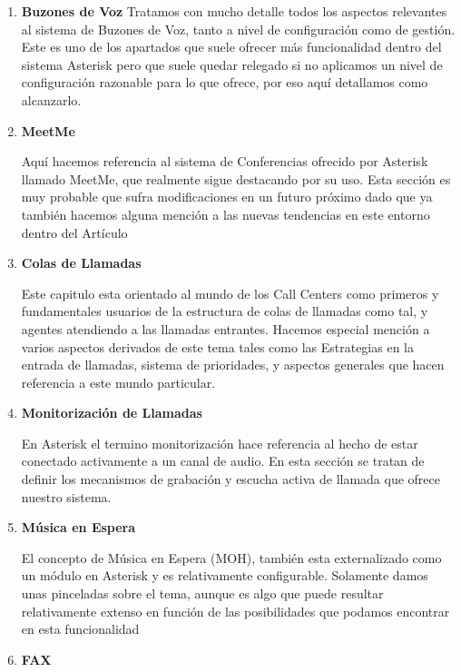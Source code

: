 \begin{enumerate}
	  \setlength{\itemsep}{10pt}

	\item \textbf{Buzones de Voz}
	Tratamos con mucho detalle todos los aspectos relevantes al sistema de Buzones de Voz, tanto a nivel de configuración como de gestión. Este es uno de los apartados que suele ofrecer más funcionalidad dentro del sistema Asterisk pero que suele quedar relegado si no aplicamos un nivel de configuración razonable para lo que ofrece, por eso aquí detallamos como alcanzarlo.
	
	\item \textbf{MeetMe}
	
	Aquí hacemos referencia al sistema de Conferencias ofrecido por Asterisk llamado MeetMe, que realmente sigue destacando por su uso. Esta sección es muy probable que sufra modificaciones en un futuro próximo dado que ya también hacemos alguna mención a las nuevas tendencias en este entorno dentro del Artículo
	
	\item \textbf{Colas de Llamadas}
	
	Este capitulo esta orientado al mundo de los Call Centers como primeros y fundamentales usuarios de la estructura de colas de llamadas como tal, y agentes atendiendo a las llamadas entrantes. Hacemos especial mención a varios aspectos derivados de este tema tales como las Estrategias en la entrada de llamadas, sistema de prioridades, y aspectos generales que hacen referencia a este mundo particular.
	
	\item \textbf{Monitorización de Llamadas}
	
	En Asterisk el termino monitorización hace referencia al hecho de estar conectado activamente a un canal de audio. En esta sección se tratan de definir los mecanismos de grabación y escucha activa de llamada que ofrece nuestro sistema.
	
  \item \textbf{Música en Espera}
	
	El concepto de Música en Espera (MOH), también esta externalizado como un módulo en Asterisk y es relativamente configurable. Solamente damos unas pinceladas sobre el tema, aunque es algo que puede resultar relativamente extenso en función de las posibilidades que podamos encontrar en esta funcionalidad
	
	\item \textbf{FAX}
	

\end{enumerate}
